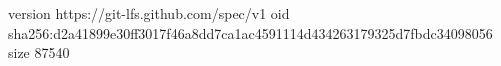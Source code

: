 version https://git-lfs.github.com/spec/v1
oid sha256:d2a41899e30ff3017f46a8dd7ca1ac4591114d434263179325d7fbdc34098056
size 87540
